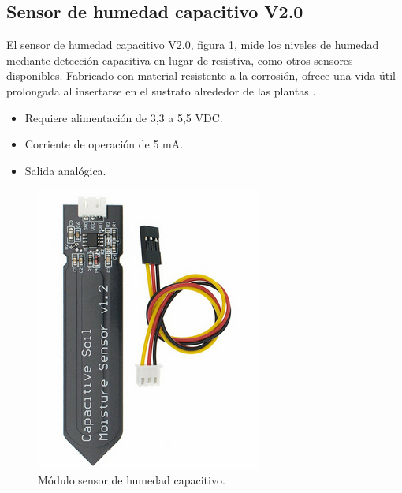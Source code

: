 
\subsection{Sensor de humedad capacitivo V2.0}

El sensor de humedad capacitivo V2.0, figura \ref{fig:moisture}, mide los niveles de humedad mediante detección capacitiva en lugar de resistiva, como otros sensores disponibles. Fabricado con material resistente a la corrosión, ofrece una vida útil prolongada al insertarse en el sustrato alrededor de las plantas \cite{MOISTURE}.

\begin{itemize}
	\item Requiere alimentación de 3,3 a 5,5 VDC.
	\item Corriente de operación de 5 mA.
	\item Salida analógica.
\end{itemize}


\begin{figure}[h]
\centering
\includegraphics[scale=.5]{./Figures/moisture.png}
	\caption{Módulo sensor de humedad capacitivo\protect\footnotemark.}
	\label{fig:moisture}
\end{figure}


